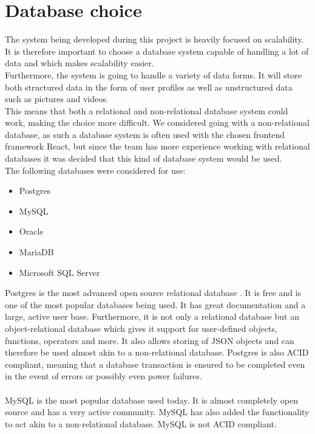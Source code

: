 \section{Database choice}
The system being developed during this project is heavily focused on scalability. It is therefore important to choose a database system capable of handling a lot of data and which makes scalability easier.
\\
Furthermore, the system is going to handle a variety of data forms. It will store both structured data in the form of user profiles as well as unstructured data such as pictures and videos.
\\
This means that both a relational and non-relational database system could work, making the choice more difficult.
We considered going with a non-relational database, as such a database system is often used with the chosen frontend framework React, but since the team has more experience working with relational databases it was decided that this kind of database system would be used.
\\
The following databases were considered for use:
\begin{itemize}
    \item Postgres
    \item MySQL
    \item Oracle
    \item MariaDB
    \item Microsoft SQL Server
\end{itemize}
Postgres is the most advanced open source relational database \cite{Postgres}.
It is free and is one of the most popular databases being used\cite{databasePopularity}.
It has great documentation and a large, active user base.
Furthermore, it is not only a relational database but an object-relational database which gives it support for user-defined objects, functions, operators and more.
It also allows storing of JSON objects and can therefore be used almost akin to a non-relational database.
Postgres is also ACID compliant, meaning that a database transaction is ensured to be completed even in the event of errors or possibly even power failures.
\\
\\
MySQL is the most popular database used today\cite{databasePopularity}.
It is almost completely open source and has a very active community\cite{MySQL}.
MySQL has also added the functionality to act akin to a non-relational database.
MySQL is not ACID compliant.
\\
